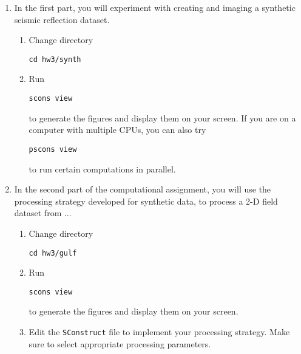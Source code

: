 \begin{enumerate}
\item In the first part, you will experiment with creating and 
  imaging a synthetic seismic reflection dataset.

\begin{enumerate}
\item Change directory 
\begin{verbatim}
cd hw3/synth
\end{verbatim}
\item Run
\begin{verbatim}
scons view
\end{verbatim}
to generate the figures and display them on your screen.
If you are on a computer with multiple CPUs, you
can also try
\begin{verbatim}
pscons view
\end{verbatim}
to run certain computations in parallel.
\end{enumerate}

\lstset{language=python,numbers=left,numberstyle=\tiny,showstringspaces=false}
%

\lstset{language=c,numbers=left,numberstyle=\tiny,showstringspaces=false}
%

\item In the second part of the computational assignment, you will use the processing strategy developed for synthetic data, 
to process a 2-D field dataset from ...

\begin{enumerate}
\item Change directory 
\begin{verbatim}
cd hw3/gulf
\end{verbatim}
\item Run
\begin{verbatim}
scons view
\end{verbatim}
to generate the figures and display them on your screen.
\item Edit the \texttt{SConstruct} file to implement your processing strategy. 
Make sure to select appropriate processing parameters.
\end{enumerate}

\lstset{language=python,numbers=left,numberstyle=\tiny,showstringspaces=false}
%

\end{enumerate}

